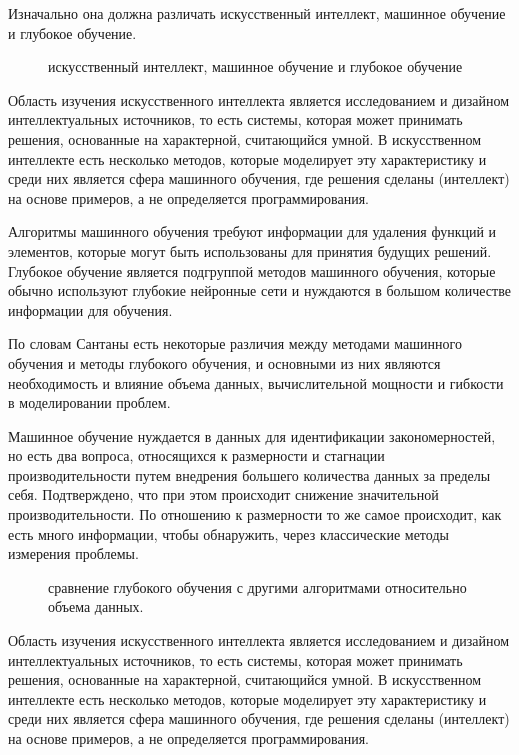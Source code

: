 Изначально она должна различать искусственный интеллект, машинное обучение и глубокое обучение.

 \begin{figure*}[h]
    \caption{искусственный интеллект, машинное обучение и глубокое обучение}
 \end{figure*}

 Область изучения искусственного интеллекта является исследованием и дизайном интеллектуальных источников, 
 то есть системы, которая может принимать решения,
 основанные на характерной, считающийся умной.
 В искусственном интеллекте есть несколько методов, 
 которые моделирует эту характеристику и среди них является сфера машинного обучения,
 где решения сделаны (интеллект) на основе примеров,
 а не определяется программирования. 

 Алгоритмы машинного обучения требуют информации для удаления функций и элементов, 
 которые могут быть использованы для принятия будущих решений. 
 Глубокое обучение является подгруппой методов машинного обучения,
 которые обычно используют глубокие нейронные сети и нуждаются 
 в большом количестве информации для обучения. 

 По словам Сантаны есть некоторые различия между методами машинного обучения и методы глубокого обучения, 
 и основными из них являются необходимость и влияние объема данных, 
 вычислительной мощности и гибкости в моделировании проблем.

 Машинное обучение нуждается в данных для идентификации закономерностей, но есть два вопроса, 
 относящихся к размерности и стагнации производительности путем внедрения большего количества данных за пределы себя. 
 Подтверждено, что при этом происходит снижение значительной производительности. 
 По отношению к размерности то же самое происходит, 
 как есть много информации, чтобы обнаружить, 
 через классические методы измерения проблемы.

 \begin{figure*}[h]
    \caption{сравнение глубокого обучения с другими алгоритмами относительно объема данных.}
 \end{figure*}

 Область изучения искусственного интеллекта является исследованием и дизайном интеллектуальных источников, 
 то есть системы, которая может принимать решения, основанные на характерной, считающийся умной. 
 В искусственном интеллекте есть несколько методов, которые моделирует эту характеристику и среди них является сфера машинного обучения,
 где решения сделаны (интеллект) на основе примеров, а не определяется программирования.

